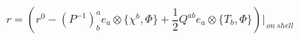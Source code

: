 \begin{equation}
r=
(r^{0}-(P^{-1})^a_b e_a\otimes \{\chi^b,\Phi\}+
\frac12 Q^{ab} e_a\otimes \{T_b,\Phi\})\Big|_{\,on~shell}
\label{viaDirac}
\end{equation}

